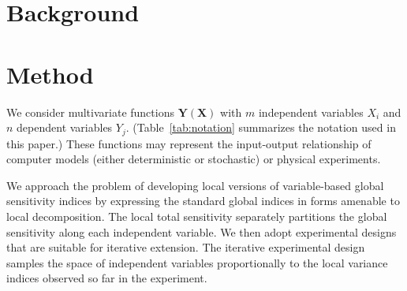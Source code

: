 \documentclass[12pt]{article}
\begin{document}
\section{Background}


\section{Method}

We consider multivariate functions $\mathbf{Y} \left( \mathbf{X} \right)$ with $m$ independent variables $X_i$ and $n$ dependent variables $Y_j$. (Table~\ref{tab:notation} summarizes the notation used in this paper.) These functions may represent the input-output relationship of computer models (either deterministic or stochastic) or physical experiments.

We approach the problem of developing local versions of variable-based global sensitivity indices by expressing the standard global indices \cite{saltelli_variance_2010} in forms amenable to local decomposition. The local total sensitivity separately partitions the global sensitivity along each independent variable. We then adopt experimental designs that are suitable for iterative extension. The iterative experimental design samples the space of independent variables proportionally to the local variance indices observed so far in the experiment.
\end{document}
